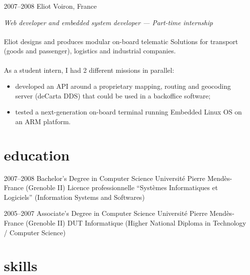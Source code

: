 \documentclass[]{friggeri-cv}
\begin{document}
\begin{entrylist}
  \entry
    {2007--2008}
    {Eliot}
    {Voiron, France}
    {
        \textit{Web developer and embedded system developer --- Part-time
        internship} \\
        \\
        Eliot designs and produces modular on-board telematic Solutions for
        transport (goods and passenger), logistics and industrial companies. \\
        \\
        As a student intern, I had 2 different missions in parallel:
        \begin{itemize}
          \item developed an API around a proprietary mapping, routing and
                geocoding server (deCarta DDS) that could be used in a
                backoffice software;
          \item tested a next-generation on-board terminal running Embedded
                Linux OS on an ARM platform.
        \end{itemize}
    }

\end{entrylist}



\section{education}

\begin{entrylist}

\entry
  {2007--2008}
  {Bachelor's Degree {\normalfont in Computer Science}}
  {Université Pierre Mendès-France (Grenoble II)}
  {
    Licence professionnelle ``Systèmes Informatiques et Logiciels''
    (Information Systems and Softwares)
  }

\entry
  {2005--2007}
  {Associate's Degree {\normalfont in Computer Science}}
  {Université Pierre Mendès-France (Grenoble II)}
  {
    DUT Informatique (Higher National Diploma in Technology / Computer
    Science)
  }

\end{entrylist}



\newpage

\section{skills}
\end{document}
